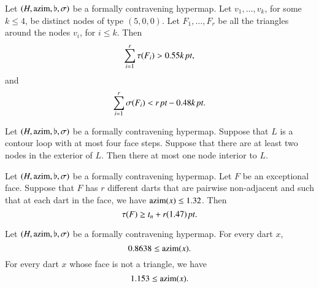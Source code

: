 \begin{lemma} \label{lemma:0.55:bis} %
Let $(H,{\operatorname{azim}},\flat,\sigma)$ be a formally contravening hypermap.
Let $v_1,\ldots, v_k$, for some $k\le 4$, be distinct nodes of type
$(5,0,0)$.  Let $F_1,\ldots, F_r$ be all the triangles around the
nodes $v_i$, for $i\le k$. Then
    $$
    \sum_{i=1}^r \tau(F_i)> 0.55k\,\hbox{\it pt},
    $$
and
    $$\sum_{i=1}^r \sigma(F_i) < r\,\hbox{\it pt} - 0.48k\,\hbox{\it pt}.$$
\end{lemma}


\begin{lemma}\label{lemma:no-2}
Let $(H,{\operatorname{azim}},\flat,\sigma)$ be a formally contravening hypermap.
Suppose that $L$ is a contour loop with at most four face steps.
Suppose that there are at least two nodes in the exterior of $L$.
Then there at most one node interior to $L$.
\end{lemma}





\begin{lemma}\label{lemma:1.47}
Let $(H,{\operatorname{azim}},\flat,\sigma)$ be a formally contravening
hypermap. Let $F$ be an exceptional face.  Suppose that $F$ has $r$
different darts that are pairwise non-adjacent and such that at each
dart in the face, we have ${\operatorname{azim}}(x) \le 1.32$.    Then
    $$\tau(F) \ge t_n + r (1.47)\,\hbox{\it pt}.$$
\end{lemma}

\begin{lemma} \label{lemma:0.8638}
Let $(H,{\operatorname{azim}},\flat,\sigma)$ be a formally contravening
hypermap. For every dart $x$,
    $$0.8638\le {\operatorname{azim}}(x).$$
For every dart $x$ whose face is not a triangle, we have
    $$1.153\le{\operatorname{azim}}(x).$$
\end{lemma}


